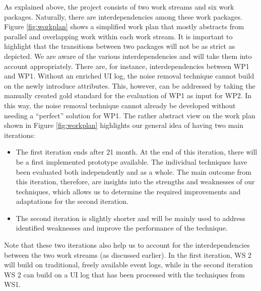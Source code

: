 As explained above, the project consists of two work streams and six work packages. Naturally, there are interdependencies among these work packages. Figure \ref{fig:workplan} shows a simplified work plan that mostly abstracts from parallel and overlapping work within each work stream. It is important to highlight that the transitions between two packages will not be as strict as depicted. We are aware of the various interdependencies and will take them into account appropriately.  
There are, for instance, interdependencies between WP1 and WP1. Without an enriched UI log, the noise removal technique cannot build on the newly introduce attributes. This, however, can be addressed by taking the manually created gold standard for the evaluation of WP1 as input for WP2. In this way, the noise removal technique cannot already be developed without needing a ``perfect'' solution for WP1. The rather abstract view on the work plan shown in Figure \ref{fig:workplan} highlights our general idea of having two main iterations:
\begin{itemize}
	\item The first iteration ends after 21 month. At the end of this iteration, there will be a first implemented prototype available. The individual techniques have been evaluated both independently and as a whole. The main outcome from this iteration, therefore, are insights into the strengths and weaknesses of our techniques, which allows us to determine the required improvements and adaptations for the second iteration. 
	\item The second iteration is slightly shorter and will be mainly used to address identified weaknesses and improve the performance of the technique.
\end{itemize} 

Note that these two iterations also help us to account for the interdependencies between the two work streams (as discussed earlier). In the first iteration, WS 2 will build on traditional, freely available event logs, while in the second iteration WS 2 can build on a UI log that has been processed with the techniques from WS1. 



